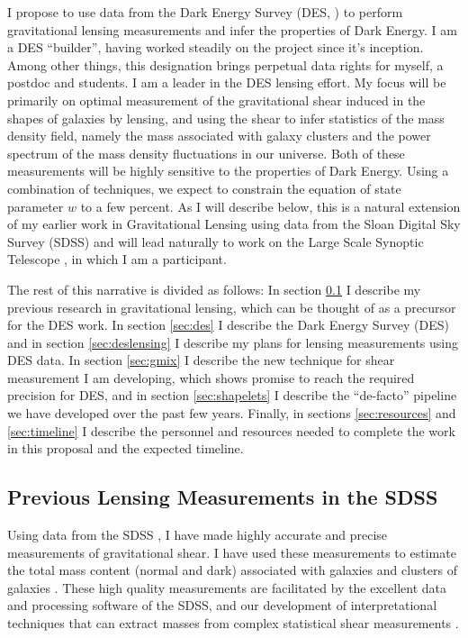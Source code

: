 \documentclass[12pt]{article}
\begin{document}
I propose to use data from the Dark Energy Survey (DES, \cite{DESWhitePaper})
to perform gravitational lensing measurements and infer the properties of Dark
Energy.  I am a DES ``builder'', having worked steadily on the project since
it's inception.  Among other things, this designation brings perpetual data
rights for myself, a postdoc and students.  I am a leader in the DES lensing
effort.  My focus will be primarily on optimal measurement of the gravitational
shear induced in the shapes of galaxies by lensing, and using the shear to
infer statistics of the mass density field, namely the mass associated with
galaxy clusters and the power spectrum of the mass density fluctuations in our
universe. Both of these measurements will be highly sensitive to the properties
of Dark Energy.  Using a combination of techniques, we expect to constrain the
equation of state parameter $w$ to a few percent.  As I will describe below,
this is a natural extension of my earlier work in Gravitational Lensing using
data from the Sloan Digital Sky Survey (SDSS) and will lead naturally to work
on the Large Scale Synoptic Telescope \cite{lsstweb}, in which I am a
participant.

The rest of this narrative is divided as follows: In section \ref{sec:sdssold}
I describe my previous research in gravitational lensing, which can be thought
of as a precursor for the DES work.  In section \ref{sec:des} I describe the
Dark Energy Survey (DES) and in section \ref{sec:deslensing} I describe my
plans for lensing measurements using DES data.  In section \ref{sec:gmix} I
describe the new technique for shear measurement I am developing, which
shows promise to reach the required precision for DES, and in section
\ref{sec:shapelets} I describe the ``de-facto'' pipeline we have developed over
the past few years.  Finally, in sections \ref{sec:resources} and
\ref{sec:timeline} I describe the personnel and resources needed to complete the
work in this proposal and the expected timeline.

\subsection{Previous Lensing Measurements in the SDSS} \label{sec:sdssold}

Using data from the SDSS \cite{York00}, I have made highly accurate and precise
measurements of gravitational shear. I have used these measurements to estimate
the total mass content (normal and dark) associated with galaxies and clusters
of galaxies
\cite{fis00,Sheldon04,SheldonLensing07,JohnstonLensing07,SheldonM2L07}.  These
high quality measurements are facilitated by the excellent data and processing
software of the SDSS, and our development of interpretational techniques that
can extract masses from complex statistical shear measurements
\cite{JohnstonInvert07}.
\end{document}
